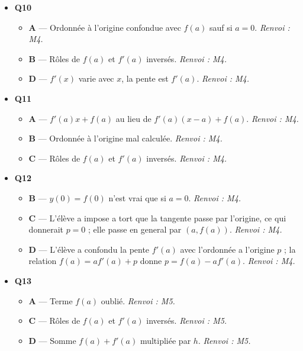 \begin{itemize}
\begin{itemize}
    \item \textbf{C} — L'élève a donne l'abscisse du point de contact $a$ au lieu du coefficient directeur de la tangente, qui est $f'(a)$. \emph{Renvoi : M3, M4.}
    \item \textbf{D} — La tangente n'est pas une sécante. \emph{Renvoi : M3.}
  \end{itemize}
  \item \textbf{Q10}
  \begin{itemize}
    \item \textbf{A} — Ordonnée à l'origine confondue avec $f(a)$ sauf si $a=0$. \emph{Renvoi : M4.}
    \item \textbf{B} — Rôles de $f(a)$ et $f'(a)$ inversés. \emph{Renvoi : M4.}
    \item \textbf{D} — $f'(x)$ varie avec $x$, la pente est $f'(a)$. \emph{Renvoi : M4.}
  \end{itemize}
  \item \textbf{Q11}
  \begin{itemize}
    \item \textbf{A} — $f'(a)x + f(a)$ au lieu de $f'(a)(x-a)+f(a)$. \emph{Renvoi : M4.}
    \item \textbf{B} — Ordonnée à l'origine mal calculée. \emph{Renvoi : M4.}
    \item \textbf{C} — Rôles de $f(a)$ et $f'(a)$ inversés. \emph{Renvoi : M4.}
  \end{itemize}
  \item \textbf{Q12}
  \begin{itemize}
    \item \textbf{B} — $y(0)=f(0)$ n'est vrai que si $a=0$. \emph{Renvoi : M4.}
    \item \textbf{C} — L'élève a impose a tort que la tangente passe par l'origine, ce qui donnerait $p=0$ ; elle passe en general par $(a,f(a))$. \emph{Renvoi : M4.}
    \item \textbf{D} — L'élève a confondu la pente $f'(a)$ avec l'ordonnée a l'origine $p$ ; la relation $f(a)=af'(a)+p$ donne $p=f(a)-af'(a)$. \emph{Renvoi : M4.}
  \end{itemize}
  \item \textbf{Q13}
  \begin{itemize}
    \item \textbf{A} — Terme $f(a)$ oublié. \emph{Renvoi : M5.}
    \item \textbf{C} — Rôles de $f(a)$ et $f'(a)$ inversés. \emph{Renvoi : M5.}
    \item \textbf{D} — Somme $f(a)+f'(a)$ multipliée par $h$. \emph{Renvoi : M5.}

\end{itemize}
\end{itemize}

